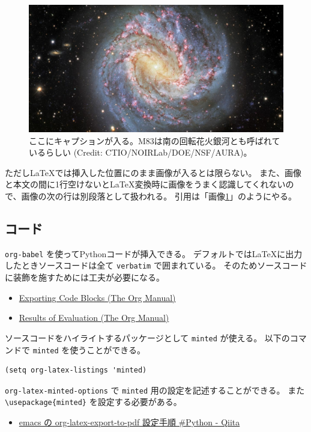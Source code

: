 \documentclass[a4paper, 10pt, notitlepage, uplatex, dvipdfmx]{jsarticle}
\begin{document}
\begin{figure}[htbp]
\centering
\includegraphics[width=1.0\linewidth]{m83.jpg}
\caption{\label{fig:m83}ここにキャプションが入る。M83は南の回転花火銀河とも呼ばれているらしい (Credit: CTIO/NOIRLab/DOE/NSF/AURA)。}
\end{figure}

ただし\LaTeX{}では挿入した位置にのまま画像が入るとは限らない。
また、画像と本文の間に1行空けないと\LaTeX{}変換時に画像をうまく認識してくれないので、画像の次の行は別段落として扱われる。
引用は「画像\ref{fig:m83}」のようにやる。
\subsection{コード}
\label{sec:orgc40e900}
\texttt{org-babel} を使ってPythonコードが挿入できる。
デフォルトでは\LaTeX{}に出力したときソースコードは全て \texttt{verbatim} で囲まれている。
そのためソースコードに装飾を施すためには工夫が必要になる。
\begin{itemize}
\item \href{https://orgmode.org/manual/Exporting-Code-Blocks.html}{Exporting Code Blocks (The Org Manual)}
\item \href{https://orgmode.org/manual/Results-of-Evaluation.html}{Results of Evaluation (The Org Manual)}
\end{itemize}

ソースコードをハイライトするパッケージとして \texttt{minted} が使える。
以下のコマンドで \texttt{minted} を使うことができる。
\begin{verbatim}
(setq org-latex-listings 'minted)
\end{verbatim}
\texttt{org-latex-minted-options} で \texttt{minted} 用の設定を記述することができる。
また \texttt{\textbackslash{}usepackage\{minted\}} を設定する必要がある。
\begin{itemize}
\item \href{https://qiita.com/clothoid/items/0a8f825ae19150fe5750}{emacs の org-latex-export-to-pdf 設定手順 \#Python - Qiita}
\end{itemize}
\end{document}
